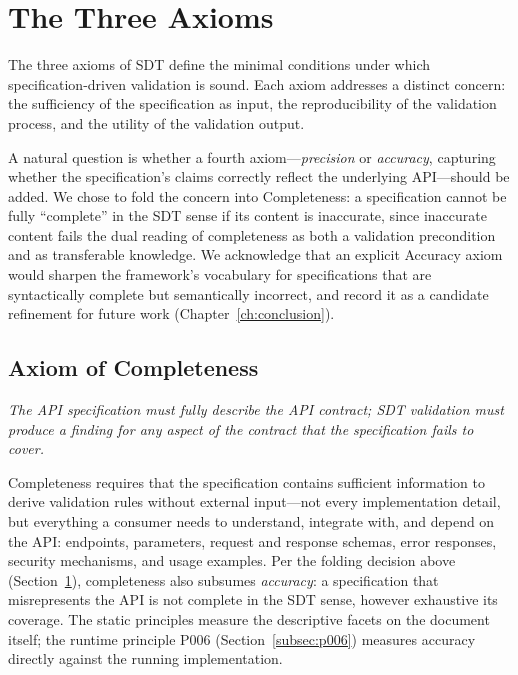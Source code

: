 \section{The Three Axioms}
\label{sec:three-axioms}

The three axioms of SDT define the minimal conditions under which specification-driven validation is sound. Each axiom addresses a distinct concern: the sufficiency of the specification as input, the reproducibility of the validation process, and the utility of the validation output.

A natural question is whether a fourth axiom---\textit{precision} or \textit{accuracy}, capturing whether the specification's claims correctly reflect the underlying API---should be added. We chose to fold the concern into Completeness: a specification cannot be fully ``complete'' in the SDT sense if its content is inaccurate, since inaccurate content fails the dual reading of completeness as both a validation precondition and as transferable knowledge. We acknowledge that an explicit Accuracy axiom would sharpen the framework's vocabulary for specifications that are syntactically complete but semantically incorrect, and record it as a candidate refinement for future work (Chapter~\ref{ch:conclusion}).

\subsection{Axiom of Completeness}
\label{subsec:axiom-completeness}

\textit{The API specification must fully describe the API contract; SDT validation must produce a finding for any aspect of the contract that the specification fails to cover.}

Completeness requires that the specification contains sufficient information to derive validation rules without external input---not every implementation detail, but everything a consumer needs to understand, integrate with, and depend on the API: endpoints, parameters, request and response schemas, error responses, security mechanisms, and usage examples. Per the folding decision above (Section~\ref{sec:three-axioms}), completeness also subsumes \emph{accuracy}: a specification that misrepresents the API is not complete in the SDT sense, however exhaustive its coverage. The static principles measure the descriptive facets on the document itself; the runtime principle P006 (Section~\ref{subsec:p006}) measures accuracy directly against the running implementation.

